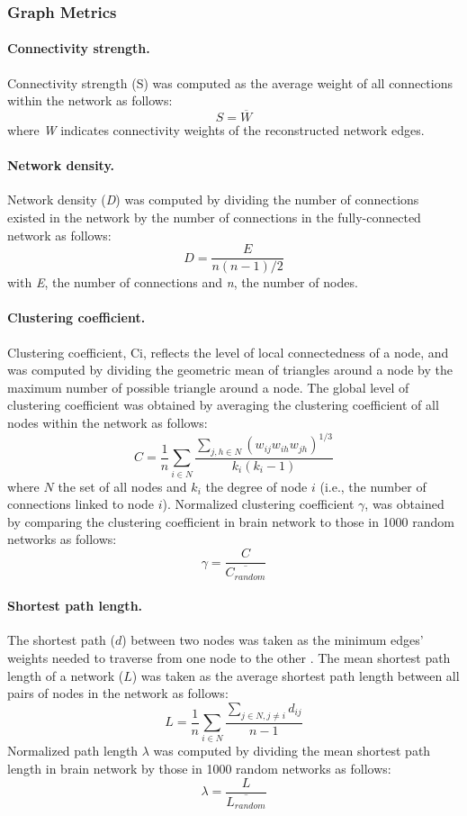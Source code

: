 \begin{refsection}
\subsubsection*{Graph Metrics}
\paragraph{Connectivity strength.}
Connectivity strength (S) was computed as the average weight of all connections within the network as follows:
\[S=\overline{W}\]
where \textit{W} indicates connectivity weights of the reconstructed network edges.

\paragraph{Network density.}
Network density (\textit{D}) was computed by dividing the number of connections existed in the network by the number of connections in the fully-connected network as follows:
\[D=\frac{E}{n(n-1)/2}\]
with \textit{E}, the number of connections and \textit{n}, the number of nodes.

\paragraph{Clustering coefficient.}
Clustering coefficient, Ci, reflects the level of local connectedness of a node, and was computed by dividing the geometric mean of triangles around a node by the maximum number of possible triangle around a node. The global level of clustering coefficient was obtained by averaging the clustering coefficient of all nodes within the network as follows:
\[C=\frac{1}{n}\sum_{i \in N} \frac{\sum_{j,h \in N} (w_{ij}w_{ih}w_{jh})^{1/3}}{k_{i}(k_{i}-1)}   \]
where $N$ the set of all nodes and $k_{i}$ the degree of node $i$ (i.e., the number of connections linked to node $i$). Normalized clustering coefficient $\gamma$, was obtained by comparing the clustering coefficient in brain network to those in 1000 random networks as follows:
\[\gamma=\frac{C}{\overline{C_{random}}} \]   

\paragraph{Shortest path length.}
The shortest path ($d$) between two nodes was taken as the minimum edges’ weights needed to traverse from one node to the other \citep{RUBINOV20101059}. The mean shortest path length of a network ($L$) was taken as the average shortest path length between all pairs of nodes in the network as follows:
\[L=\frac{1}{n} \sum_{i \in N} {\frac{\sum_{j \in N,j \neq i} {d_{ij}}}{n-1}} \]
Normalized path length $\lambda$ was computed by dividing the mean shortest path length in brain network by those in 1000 random networks as follows:
\[\lambda=\frac{L}{\overline{L_{random}}} \]


\end{refsection}

